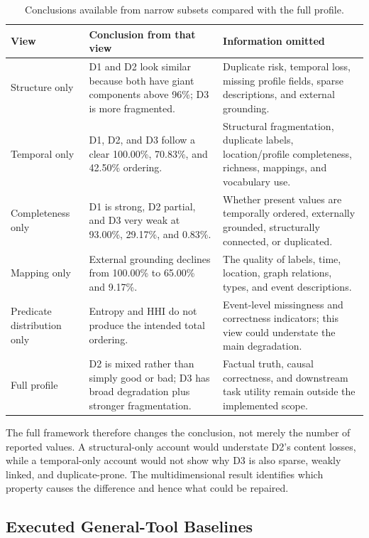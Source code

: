 \begin{table}[htbp]
\centering
\footnotesize
\caption{Conclusions available from narrow subsets compared with the full profile.}
\label{tab:final_fragmented_comparison}
\begin{tabularx}{\textwidth}{>{\raggedright\arraybackslash}p{2.6cm}XX}
\toprule
View & Conclusion from that view & Information omitted \\
\midrule
Structure only & D1 and D2 look similar because both have giant components above 96\%; D3 is more fragmented. & Duplicate risk, temporal loss, missing profile fields, sparse descriptions, and external grounding. \\
Temporal only & D1, D2, and D3 follow a clear 100.00\%, 70.83\%, and 42.50\% ordering. & Structural fragmentation, duplicate labels, location/profile completeness, richness, mappings, and vocabulary use. \\
Completeness only & D1 is strong, D2 partial, and D3 very weak at 93.00\%, 29.17\%, and 0.83\%. & Whether present values are temporally ordered, externally grounded, structurally connected, or duplicated. \\
Mapping only & External grounding declines from 100.00\% to 65.00\% and 9.17\%. & The quality of labels, time, location, graph relations, types, and event descriptions. \\
Predicate distribution only & Entropy and HHI do not produce the intended total ordering. & Event-level missingness and correctness indicators; this view could understate the main degradation. \\
Full profile & D2 is mixed rather than simply good or bad; D3 has broad degradation plus stronger fragmentation. & Factual truth, causal correctness, and downstream task utility remain outside the implemented scope. \\
\bottomrule
\end{tabularx}
\end{table}

The full framework therefore changes the conclusion, not merely the number of reported values. A structural-only account would understate D2's content losses, while a temporal-only account would not show why D3 is also sparse, weakly linked, and duplicate-prone. The multidimensional result identifies which property causes the difference and hence what could be repaired.

\subsection{Executed General-Tool Baselines}

